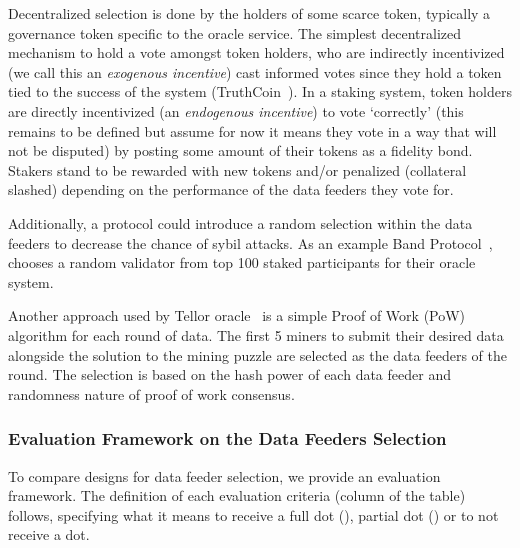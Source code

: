 
Decentralized selection is done by the holders of some scarce token, typically a governance token specific to the oracle service. The simplest decentralized mechanism to hold a vote amongst token holders, who are indirectly incentivized (we call this an \textit{exogenous incentive}) cast informed votes since they hold a token tied to the success of the system (\eg TruthCoin~\cite{sztorc2015truthcoin}). In a staking system, token holders are directly incentivized (an \textit{endogenous incentive}) to vote `correctly' (this remains to be defined but assume for now it means they vote in a way that will not be disputed) by posting some amount of their tokens as a fidelity bond. Stakers stand to be rewarded with new tokens and/or penalized (collateral slashed) depending on the performance of the data feeders they vote for.


Additionally, a protocol could introduce a random selection within the data feeders to decrease the chance of sybil attacks. As an example Band Protocol~\cite{bandwhitepaper}, chooses a random validator from top 100 staked participants for their oracle system. 

Another approach used by Tellor oracle~\cite{tellorWhitepaper} is a simple Proof of Work (PoW) algorithm for each round of data. The first 5 miners to submit their desired data alongside the solution to the mining puzzle are selected as the data feeders of the round. The selection is based on the hash power of each data feeder and randomness nature of proof of work consensus.



\subsubsection{Evaluation Framework on the Data Feeders Selection}\label{evaluation_framework}
To compare designs for data feeder selection, we provide an evaluation framework. The definition of each evaluation criteria (\ie column of the table) follows, specifying what it means to receive a full dot (\full), partial dot (\prt) or to not receive a dot. 


